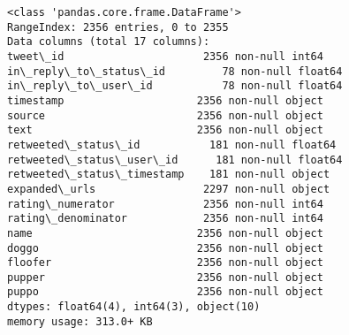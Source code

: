 \documentclass[11pt]{article}
\begin{document}
    \begin{Verbatim}[commandchars=\\\{\}]
<class 'pandas.core.frame.DataFrame'>
RangeIndex: 2356 entries, 0 to 2355
Data columns (total 17 columns):
tweet\_id                      2356 non-null int64
in\_reply\_to\_status\_id         78 non-null float64
in\_reply\_to\_user\_id           78 non-null float64
timestamp                     2356 non-null object
source                        2356 non-null object
text                          2356 non-null object
retweeted\_status\_id           181 non-null float64
retweeted\_status\_user\_id      181 non-null float64
retweeted\_status\_timestamp    181 non-null object
expanded\_urls                 2297 non-null object
rating\_numerator              2356 non-null int64
rating\_denominator            2356 non-null int64
name                          2356 non-null object
doggo                         2356 non-null object
floofer                       2356 non-null object
pupper                        2356 non-null object
puppo                         2356 non-null object
dtypes: float64(4), int64(3), object(10)
memory usage: 313.0+ KB

    \end{Verbatim}
\end{document}
